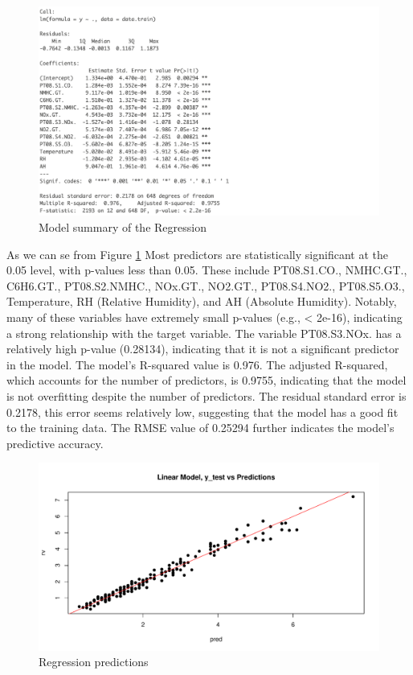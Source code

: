 \documentclass{article}
\begin{document}
\begin{figure}[h!]
   \centering
   \includegraphics[width=\linewidth]{images/Screenshot 2024-09-17 alle 18.47.02.png}
   \caption{Model summary of the Regression}
   \label{fig:fig17}
\end{figure}
As we can se from Figure \ref{fig:fig17} Most predictors are statistically significant at the 0.05 level, with p-values less than 0.05. These include PT08.S1.CO., NMHC.GT., C6H6.GT., PT08.S2.NMHC., NOx.GT., NO2.GT., PT08.S4.NO2., PT08.S5.O3., Temperature, RH (Relative Humidity), and AH (Absolute Humidity). Notably, many of these variables have extremely small p-values (e.g., < 2e-16), indicating a strong relationship with the target variable. The variable PT08.S3.NOx. has a relatively high p-value (0.28134), indicating that it is not a significant predictor in the model.
The model's R-squared value is 0.976. The adjusted R-squared, which accounts for the number of predictors, is 0.9755, indicating that the model is not overfitting despite the number of predictors.
The residual standard error is 0.2178, this error seems relatively low, suggesting that the model has a good fit to the training data. The RMSE value of 0.25294 further indicates the model's predictive accuracy.
\begin{figure}[H]
   \centering
   \includegraphics[width=\linewidth]{images/linear_model.pdf}
   \caption{Regression predictions}
   \label{fig:fig18}
\end{figure}
\end{document}
